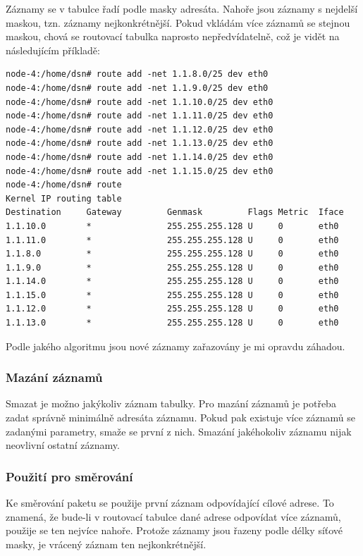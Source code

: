 Záznamy se v tabulce řadí podle masky adresáta. Nahoře jsou záznamy s nejdelší maskou, tzn. záznamy nejkonkrétnější. Pokud vkládám více záznamů se stejnou maskou, chová se routovací tabulka naprosto nepředvídatelně, což je vidět na následujícím příkladě:
\begin{small}
\begin{verbatim}
node-4:/home/dsn# route add -net 1.1.8.0/25 dev eth0
node-4:/home/dsn# route add -net 1.1.9.0/25 dev eth0
node-4:/home/dsn# route add -net 1.1.10.0/25 dev eth0
node-4:/home/dsn# route add -net 1.1.11.0/25 dev eth0
node-4:/home/dsn# route add -net 1.1.12.0/25 dev eth0
node-4:/home/dsn# route add -net 1.1.13.0/25 dev eth0
node-4:/home/dsn# route add -net 1.1.14.0/25 dev eth0
node-4:/home/dsn# route add -net 1.1.15.0/25 dev eth0
node-4:/home/dsn# route
Kernel IP routing table
Destination     Gateway         Genmask         Flags Metric  Iface
1.1.10.0        *               255.255.255.128 U     0       eth0
1.1.11.0        *               255.255.255.128 U     0       eth0
1.1.8.0         *               255.255.255.128 U     0       eth0
1.1.9.0         *               255.255.255.128 U     0       eth0
1.1.14.0        *               255.255.255.128 U     0       eth0
1.1.15.0        *               255.255.255.128 U     0       eth0
1.1.12.0        *               255.255.255.128 U     0       eth0
1.1.13.0        *               255.255.255.128 U     0       eth0
\end{verbatim}
\end{small}
Podle jakého algoritmu jsou nové záznamy zařazovány je mi opravdu záhadou.

\subsubsection{Mazání záznamů}

Smazat je možno jakýkoliv záznam tabulky. Pro mazání záznamů je potřeba zadat správně minimálně adresáta záznamu. Pokud pak existuje více záznamů se zadanými parametry, smaže se první z nich. Smazání jakéhokoliv záznamu nijak neovlivní ostatní záznamy.

\subsubsection{Použití pro směrování}\label{routTabulka_pouzitiPriSmerovani}

Ke směrování paketu se použije první záznam odpovídající cílové adrese. To znamená, že bude-li v routovací tabulce dané adrese odpovídat více záznamů, použije se ten nejvíce nahoře. Protože záznamy jsou řazeny podle délky síťové masky, je vrácený záznam ten nejkonkrétnější.


